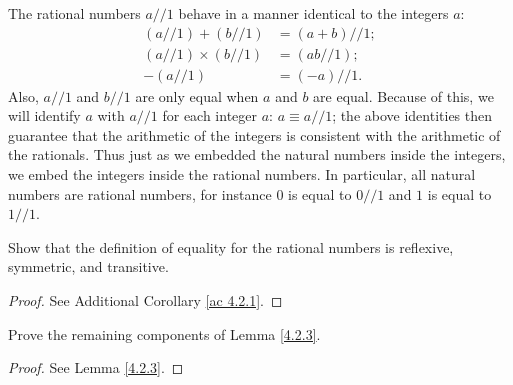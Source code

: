 \begin{note}
The rational numbers \(a // 1\) behave in a manner identical to the integers \(a\):
\begin{align*}
    (a // 1) + (b // 1) &= (a + b) // 1; \\
    (a // 1) \times (b // 1) &= (ab // 1); \\
    -(a // 1) &= (-a) // 1.
\end{align*}
Also, \(a // 1\) and \(b // 1\) are only equal when \(a\) and \(b\) are equal.
Because of this, we will identify \(a\) with \(a // 1\) for each integer \(a\): \(a \equiv a // 1\);
the above identities then guarantee that the arithmetic of the integers is consistent with the arithmetic of the rationals.
Thus just as we embedded the natural numbers inside the integers, we embed the integers inside the rational numbers.
In particular, all natural numbers are rational numbers, for instance \(0\) is equal to \(0 // 1\) and \(1\) is equal to \(1 // 1\).
\end{note}

\exercisesection

\begin{exercise}\label{ex 4.2.1}
Show that the definition of equality for the rational numbers is reflexive, symmetric, and transitive.
\end{exercise}

\begin{proof}
See Additional Corollary \ref{ac 4.2.1}.
\end{proof}

\begin{exercise}\label{ex 4.2.2}
Prove the remaining components of Lemma \ref{4.2.3}.
\end{exercise}

\begin{proof}
See Lemma \ref{4.2.3}.
\end{proof}